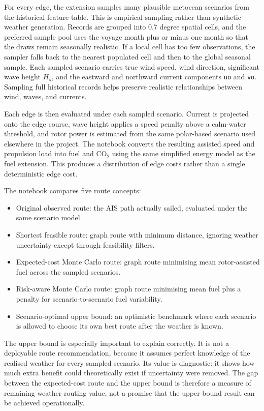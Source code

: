 \documentclass[10pt,a4paper]{article}
\newcommand{\co}{CO$_2$}
\newcommand{\hs}{$H_s$}
\begin{document}
For every edge, the extension samples many plausible metocean scenarios from
the historical feature table. This is empirical sampling rather than synthetic
weather generation. Records are grouped into 0.7 degree spatial cells, and the
preferred sample pool uses the voyage month plus or minus one month so that the
draws remain seasonally realistic. If a local cell has too few observations,
the sampler falls back to the nearest populated cell and then to the global
seasonal sample. Each sampled scenario carries true wind speed, wind direction,
significant wave height \hs{}, and the eastward and northward current
components \texttt{uo} and \texttt{vo}. Sampling full historical records helps
preserve realistic relationships between wind, waves, and currents.

Each edge is then evaluated under each sampled scenario. Current is projected
onto the edge course, wave height applies a speed penalty above a calm-water
threshold, and rotor power is estimated from the same polar-based scenario used
elsewhere in the project. The notebook converts the resulting assisted speed
and propulsion load into fuel and \co{} using the same simplified energy model
as the fuel extension. This produces a distribution of edge costs rather than a
single deterministic edge cost.

The notebook compares five route concepts:

\begin{itemize}
    \item Original observed route: the AIS path actually sailed, evaluated
    under the same scenario model.
    \item Shortest feasible route: graph route with minimum distance, ignoring
    weather uncertainty except through feasibility filters.
    \item Expected-cost Monte Carlo route: graph route minimising mean
    rotor-assisted fuel across the sampled scenarios.
    \item Risk-aware Monte Carlo route: graph route minimising mean fuel plus a
    penalty for scenario-to-scenario fuel variability.
    \item Scenario-optimal upper bound: an optimistic benchmark where each
    scenario is allowed to choose its own best route after the weather is known.
\end{itemize}

The upper bound is especially important to explain correctly. It is not a
deployable route recommendation, because it assumes perfect knowledge of the
realised weather for every sampled scenario. Its value is diagnostic: it shows
how much extra benefit could theoretically exist if uncertainty were removed.
The gap between the expected-cost route and the upper bound is therefore a
measure of remaining weather-routing value, not a promise that the upper-bound
result can be achieved operationally.
\end{document}
